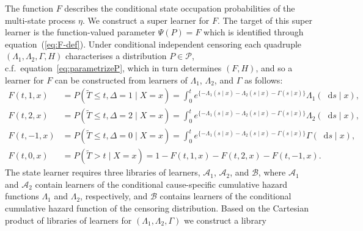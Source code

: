 \documentclass[unnumsec,webpdf,contemporary,large,namedate]{oup-authoring-template}%
\theoremstyle{thmstyleone}%
\theoremstyle{thmstyletwo}%
\theoremstyle{thmstylethree}%
\newcommand*\diff{\mathop{}\!\mathrm{d}}
\newcommand{\midd}{\; \middle|\;}
\newcommand{\1}{\mathds{1}}
\newcommand{\data}{\ensuremath{\mathcal{D}}}
\begin{document}
The function \( F \) describes the conditional state occupation
probabilities of the multi-state process \(\eta\). We construct a
super learner for \( F \). The target of this super learner is the
function-valued parameter $\Psi(P) = F$ which is identified through
equation~(\ref{eq:F-def}).
Under conditional independent censoring each quadruple
$(\Lambda_{1}, \Lambda_{2}, \Gamma, H)$ characterises a distribution
\(P\in\mathcal P\), c.f.\ equation~\eqref{eq:parametrizeP}, which in turn
determines \( (F, H) \),
and so a learner for \( F \) can be constructed from learners of
\( \Lambda_1 \), \( \Lambda_2 \), and $\Gamma$ as follows:
\begin{equation}\label{eq:transition}
  \begin{split}
  F(t, 1, x)
  & = P(\tilde{T} \leq t, \Delta=1 \mid X=x)
    = \int_0^t e^{\{-\Lambda_{1}(s \mid x)-\Lambda_{2}(s \mid x) - \Gamma(s \mid x)\} }  \Lambda_{1}(\diff s \mid x),
  \\
  F(t, 2, x)
  & = P(\tilde{T} \leq t, \Delta=2 \mid X=x)
    = \int_0^t e^{\{-\Lambda_{1}(s \mid x)-\Lambda_{2}(s \mid x) - \Gamma(s \mid x)\} }  \Lambda_{2}(\diff s \mid x),
  \\
  F(t, -1, x)
  & =
    P(\tilde{T} \leq t, \Delta=0 \mid X=x)
    = \int_0^t e^{\{-\Lambda_{1}(s \mid x)-\Lambda_{2}(s \mid x) - \Gamma(s \mid x)\} }  \Gamma(\diff s \mid x),
  \\
  F(t, 0, x)
  &
    = P(\tilde{T} > t \mid X= x)
    = 1- F(t, 1, x) - F(t, 2, x)- F(t, -1, x).
  \end{split}
\end{equation}
The state learner requires three libraries of learners,
\(\mathcal{A}_1\), \( \mathcal{A}_2 \), and \( \mathcal{B} \), where
\(\mathcal{A}_1\) and \( \mathcal{A}_2\) contain learners of the
conditional cause-specific cumulative hazard functions \(\Lambda_1\)
and \( \Lambda_2\), respectively, and \(\mathcal{B}\) contains
learners of the conditional cumulative hazard function of the
censoring distribution. %
Based on the Cartesian product of
libraries of learners for \((\Lambda_1,\Lambda_2,\Gamma)\) we construct a library
\end{document}
